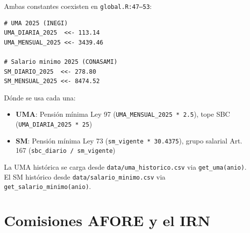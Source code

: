 \documentclass[11pt,a4paper]{report}
\begin{document}
\begin{tcolorbox}[colback=orange!5!white, colframe=orange!75!black, title=\textbf{Aplicaci\'on en C\'odigo}]
Ambas constantes coexisten en \texttt{global.R:47--53}:

\begin{lstlisting}
# UMA 2025 (INEGI)
UMA_DIARIA_2025  <<- 113.14
UMA_MENSUAL_2025 <<- 3439.46

# Salario minimo 2025 (CONASAMI)
SM_DIARIO_2025  <<- 278.80
SM_MENSUAL_2025 <<- 8474.52
\end{lstlisting}

D\'onde se usa cada una:
\begin{itemize}[nosep]
\item \textbf{UMA}: Pensi\'on m\'inima Ley 97 (\texttt{UMA\_MENSUAL\_2025 * 2.5}), tope SBC (\texttt{UMA\_DIARIA\_2025 * 25})
\item \textbf{SM}: Pensi\'on m\'inima Ley 73 (\texttt{sm\_vigente * 30.4375}), grupo salarial Art. 167 (\texttt{sbc\_diario / sm\_vigente})
\end{itemize}

La UMA hist\'orica se carga desde \texttt{data/uma\_historico.csv} via \texttt{get\_uma(anio)}. El SM hist\'orico desde \texttt{data/salario\_minimo.csv} via \texttt{get\_salario\_minimo(anio)}.
\end{tcolorbox}

\section{Comisiones AFORE y el IRN}
\end{document}
